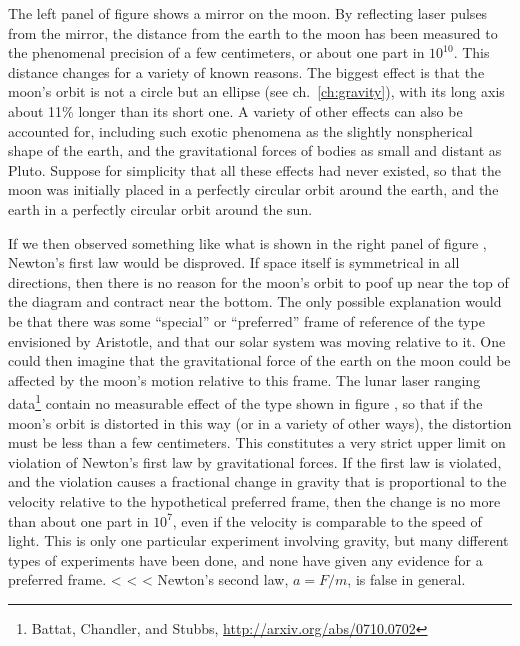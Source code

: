 \begin{listing}{1}
\begin{listing}{1}
\begin{listing}{1}
The left panel of figure  shows a mirror on the moon.
By reflecting laser pulses from the mirror, the distance from the earth to
the moon has been measured to the phenomenal precision of a few centimeters, or about one part in $10^{10}$. This distance
changes for a variety of known reasons. The biggest effect is that the moon's orbit is not a circle but an ellipse (see ch.~\ref{ch:gravity}),
with its long axis about 11\% longer than its short one. A variety of other effects can also be accounted for, including such
exotic phenomena as the slightly nonspherical shape of the earth, and the gravitational forces of bodies as small and distant as Pluto.
Suppose for simplicity that all these effects had never existed, so that the moon was initially placed in a perfectly circular orbit around
the earth, and the earth in a perfectly circular orbit around the sun. 

If we then observed something like what is shown in the right panel of
figure , Newton's first law would be disproved. If space itself is symmetrical in all directions, then there is no reason for
the moon's orbit to poof up near the top of the diagram and contract near the bottom. The only possible explanation would be that there was
some ``special'' or ``preferred'' frame of reference of the type envisioned by Aristotle, and that our solar system was moving relative to it.
One could then imagine that the gravitational force of the earth on the moon could be affected by the moon's motion relative to this frame.
The lunar laser ranging data\footnote{Battat, Chandler, and Stubbs, \url{http://arxiv.org/abs/0710.0702}} contain no measurable effect of the type shown
in figure , so that if the moon's orbit is distorted in this way (or in a variety of other ways), the distortion must be less than
a few centimeters. This constitutes a very strict upper limit on violation of Newton's first law by gravitational forces.
If the first law is violated, and the violation causes a fractional change in gravity that is proportional to the velocity relative to the
hypothetical preferred frame, then the change is no more than about one part in $10^7$, even if the velocity is comparable to the speed of
light. This is only one particular experiment involving gravity, but many different types of experiments have been done, and none have
given any evidence for a preferred frame.
<%
<%
<%
Newton's second law, $a=F/m$, is false in general.


\end{listing}
\end{listing}
\end{listing}
